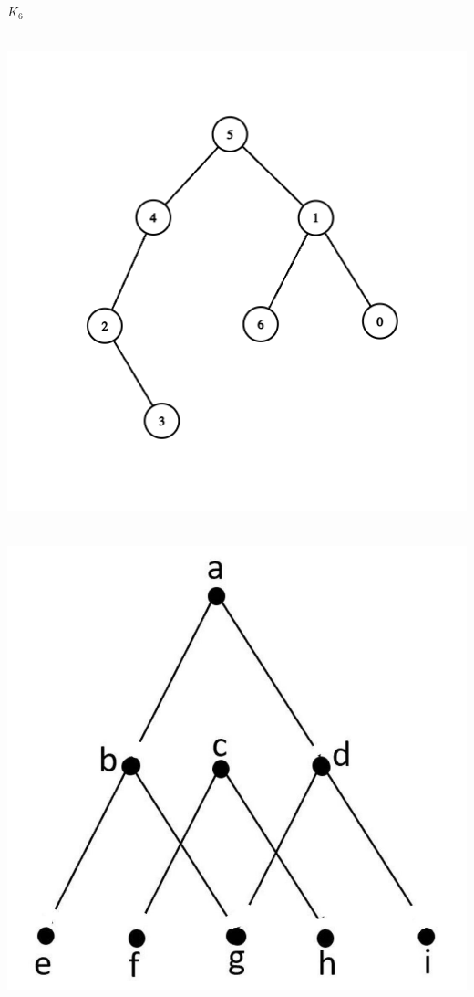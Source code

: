\documentclass[12pt]{exam}
\begin{document}
\begin{qparts}
	\item $K_6$
	\newpage
	\item ~\\\includegraphics[scale = 0.4]{Homework/Images/treebipartitesecond.png}
	\item ~\\\includegraphics[scale = 0.4]{Homework/Images/treebipartite.png}
\end{qparts}
\end{document}
